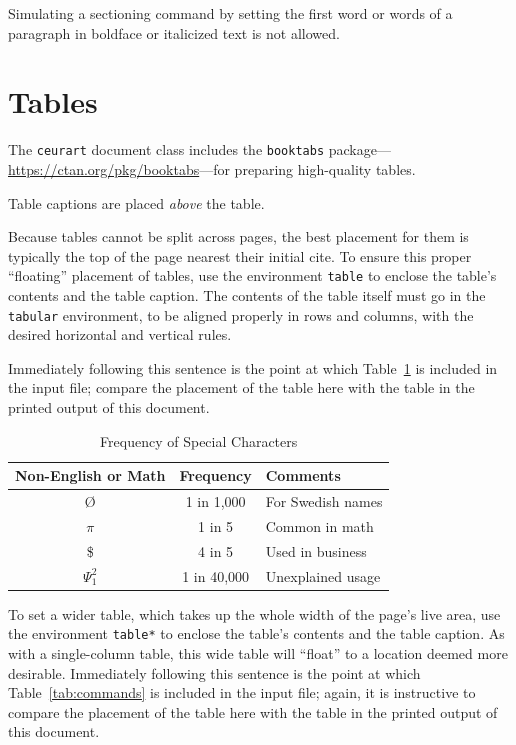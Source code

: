 \documentclass[%
hf
]{ceurart}
\begin{document}
Simulating a sectioning command by setting the first word or words of a paragraph in boldface or italicized text is not allowed.

\section{Tables}

The
\texttt{ceurart}
document class includes the
\texttt{booktabs}
package---\url{https://ctan.org/pkg/booktabs}---for preparing high-quality tables.

Table captions are placed \textit{above} the table.

Because tables cannot be split across pages, the best placement for them is typically the top of the page nearest their initial cite. To ensure this proper ``floating'' placement of tables, use the environment
\texttt{table}
to enclose the table's contents and the table caption. The contents of the table itself must go in the
\texttt{tabular}
environment, to be aligned properly in rows and columns, with the desired horizontal and vertical rules.

Immediately following this sentence is the point at which Table~\ref{tab:freq} is included in the input file; compare the placement of the table here with the table in the printed output of this document.

\begin{table}
  \caption{Frequency of Special Characters}
  \label{tab:freq}
  \begin{tabular}{ccl}
    \toprule
    Non-English or Math&Frequency&Comments\\
    \midrule
    \O & 1 in 1,000& For Swedish names\\
    $\pi$ & 1 in 5& Common in math\\
    \$ & 4 in 5 & Used in business\\
    $\Psi^2_1$ & 1 in 40,000& Unexplained usage\\
    \bottomrule
  \end{tabular}
\end{table}

To set a wider table, which takes up the whole width of the page's live area, use the environment
\texttt{table*}
to enclose the table's contents and the table caption.  As with a single-column table, this wide table will
\enquote{float}
to a location deemed more desirable.
Immediately following this sentence is the point at which Table~\ref{tab:commands} is included in the input file; again, it is instructive to compare the placement of the table here with the table in the printed output of this document.
\end{document}
